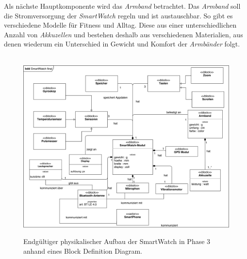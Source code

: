 Als nächste Hauptkomponente wird das \textit{Armband} betrachtet. Das \textit{Armband} soll die Stromversorgung der \textit{SmartWatch} regeln und ist austauschbar. So gibt es verschiedene Modelle für Fitness und Alltag. Diese aus einer unterschiedlichen Anzahl von \textit{Akkuzellen} und bestehen deshalb aus verschiedenen Materialien, aus denen wiederum ein Unterschied in Gewicht und Komfort der \textit{Armbänder} folgt.
\begin{figure}[h]
\centering\
\includegraphics[width=\textwidth]{img/block2}
\caption[Block Definition Diagram Phase 3]{Endgültiger physikalischer Aufbau der SmartWatch in Phase 3 anhand eines Block Definition Diagram.}\label{fig:block2}
\end{figure}
